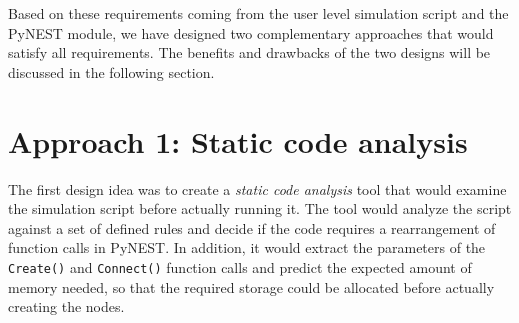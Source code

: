 Based on these requirements coming from the user level simulation script and the PyNEST module, we have designed two complementary approaches that would satisfy all requirements. The benefits and drawbacks of the two designs will be discussed in the following section.

\section{Approach 1: Static code analysis}

The first design idea was to create a \emph{static code analysis} tool that would examine the simulation script before actually running it. The tool would analyze the script against a set of defined rules and decide if the code requires a rearrangement of function calls in PyNEST. In addition, it would extract the parameters of the \texttt{Create()} and \texttt{Connect()} function calls and predict the expected amount of memory needed, so that the required storage could be allocated before actually creating the nodes.


